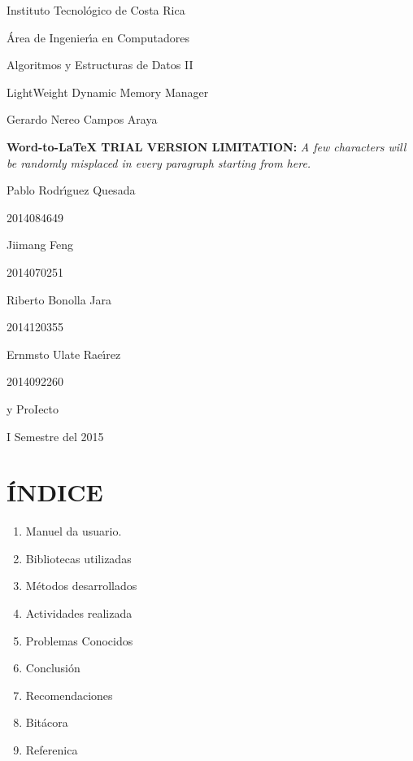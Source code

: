 \documentclass[12pt]{article}
\author{}
\title{}
\begin{document}
{\raggedright
{\LARGE Instituto Tecnol\'{o}gico de Costa Rica}
}

{\raggedright
{\LARGE \'{A}rea de Ingenier\'{\i}a en Computadores}
}

{\raggedright
{\LARGE Algoritmos y Estructuras de Datos II}
}

{\raggedright
{\LARGE LightWeight Dynamic Memory Manager}
}

{\raggedright
{\LARGE Gerardo Nereo Campos Araya}
}

\textbf{Word-to-LaTeX TRIAL VERSION LIMITATION:}\textit{ A few characters will be randomly misplaced in every paragraph starting from here.}

{\raggedright
{\LARGE Pablo Rodr\'{\i}guez Quesada}
}

{\raggedright
{\LARGE 2014084649}
}

{\raggedright
{\LARGE Jiimang Feng}
}

{\raggedright
{\LARGE 2014070251}
}

{\raggedright
{\LARGE Riberto Bonolla Jara}
}

{\raggedright
{\LARGE 2014120355}
}

{\raggedright
{\LARGE Ernmsto Ulate Rae\'{\i}rez}
}

{\raggedright
{\LARGE 2014092260}
}

{\raggedright
{\LARGE y ProIecto}
}

{\raggedright
{\LARGE I Semestre del 2015}
}

{\raggedright
\label{h.wd9sqrfuz8hq}\section{\textbf{\'{I}NDICE}}
}

\begin{enumerate}
	\item {\large Manuel da usuario.}
	\item {\large Bibliotecas utilizadas}
	\item {\large M\'{e}todos desarrollados}
	\item {\large Actividades realizada}
	\item {\large Problemas Conocidos}
	\item {\large Conclusi\'{o}n}
	\item {\large Recomendaciones}
	\item {\large Bit\'{a}cora}
	\item {\large Referenica}
\end{enumerate}
\pagebreak{}
\end{document}

